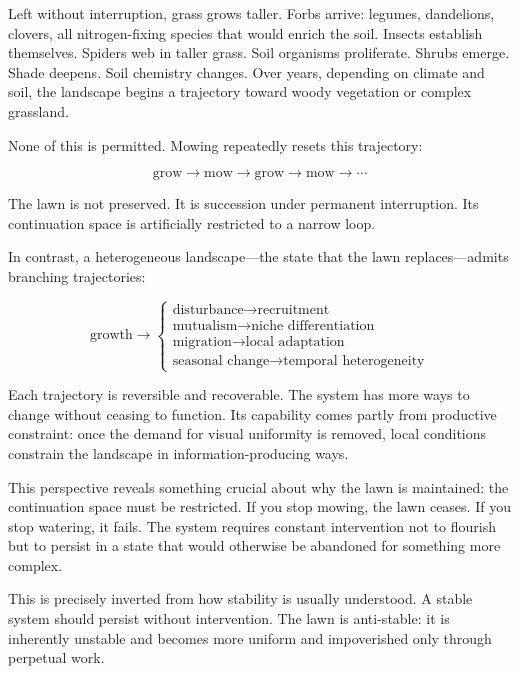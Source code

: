 \documentclass[12pt]{article}
\begin{document}
Left without interruption, grass grows taller. Forbs arrive: legumes, dandelions, clovers, all nitrogen-fixing species that would enrich the soil. Insects establish themselves. Spiders web in taller grass. Soil organisms proliferate. Shrubs emerge. Shade deepens. Soil chemistry changes. Over years, depending on climate and soil, the landscape begins a trajectory toward woody vegetation or complex grassland.

None of this is permitted. Mowing repeatedly resets this trajectory:

\begin{equation}
\text{grow} \rightarrow \text{mow} \rightarrow \text{grow} \rightarrow \text{mow} \rightarrow \cdots
\end{equation}

The lawn is not preserved. It is succession under permanent interruption. Its continuation space is artificially restricted to a narrow loop.

In contrast, a heterogeneous landscape—the state that the lawn replaces—admits branching trajectories:

\begin{equation}
\text{growth} \rightarrow \begin{cases}
\text{disturbance} \rightarrow \text{recruitment}\\
\text{mutualism} \rightarrow \text{niche differentiation}\\
\text{migration} \rightarrow \text{local adaptation}\\
\text{seasonal change} \rightarrow \text{temporal heterogeneity}
\end{cases}
\end{equation}

Each trajectory is reversible and recoverable. The system has more ways to change without ceasing to function. Its capability comes partly from productive constraint: once the demand for visual uniformity is removed, local conditions constrain the landscape in information-producing ways.

This perspective reveals something crucial about why the lawn is maintained: the continuation space must be restricted. If you stop mowing, the lawn ceases. If you stop watering, it fails. The system requires constant intervention not to flourish but to persist in a state that would otherwise be abandoned for something more complex.

This is precisely inverted from how stability is usually understood. A stable system should persist without intervention. The lawn is anti-stable: it is inherently unstable and becomes more uniform and impoverished only through perpetual work.
\end{document}
